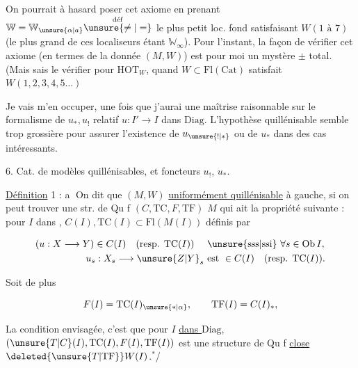 On pourrait à  hasard poser cet axiome  en prenant $\mathbb{W}=\mathbb{W}_{\unsure{\alpha|a}}\overset{\text{déf}}{\unsure{\ne|=}}$ le plus petit loc. fond satisfaisant $W(1\text{ à }7)$ (le plus grand de ces localiseurs étant $\mathbb{W}_\infty$). Pour l'instant, la façon de vérifier cet axiome  (en termes de la donnée $(M,W)$) est pour moi un mystère $\pm$ total. (Mais  sais le vérifier pour $\mathrm{HOT}_W$, quand $W\subset\mathrm{Fl}(\mathrm{Cat})$ satisfait $W(1,2,3,4,5\ldots)$

Je vais m'en occuper, une fois que j'aurai une maîtrise raisonnable sur le formalisme de $u_*,u_!$ relatif  $u:I'\to I$ dans $\mathrm{Diag}$. L'hypothèse quillénisable  semble trop grossière pour assurer l'existence de $u_{\unsure{!|*}}$ ou de $u_*$ dans des cas intéressants.

6. Cat. de modèles quillénisables, et foncteurs $u_!$, $u_*$.

\uline{Définition} 1 : \textcircled{a} On dit que $(M,W)$  \uline{uniformément quillénisable} à gauche,  si on peut trouver une str. de Qu f $(C,\mathrm{TC},F,\mathrm{TF})$  $M$ qui  ait la propriété suivante : pour $I$ dans  ,   $C(I),\mathrm{TC}(I)\subset\mathrm{Fl}(M(I))$ définis par

\[
\begin{aligned}
(u:X\longrightarrow Y)\in C(I)\quad(\text{resp. }\mathrm{TC}(I))\quad&\text{ \unsure{sss|ssi} }\forall s\in\mathrm{Ob}\,I,\\
u_s:X_s\longrightarrow \unsure{Z|Y}_s&\text{ est }\in C(I)\quad(\text{resp. }\mathrm{TC}(I)).
\end{aligned}
\]

Soit de plus

\[ F(I)=\mathrm{TC}(I)_{\unsure{*|\alpha}},\qquad \mathrm{TF}(I)=C(I)_*, \]

La condition envisagée, c'est que pour  $I$ \uline{dans $\mathrm{Diag}$}, $(\unsure{T|C}(I),\mathrm{TC}(I),F(I),\mathrm{TF}(I))$ est une structure de Qu f \uline{close}   $\deleted{\unsure{T|\mathrm{TF}}}W(I)$.$^{*}$/



